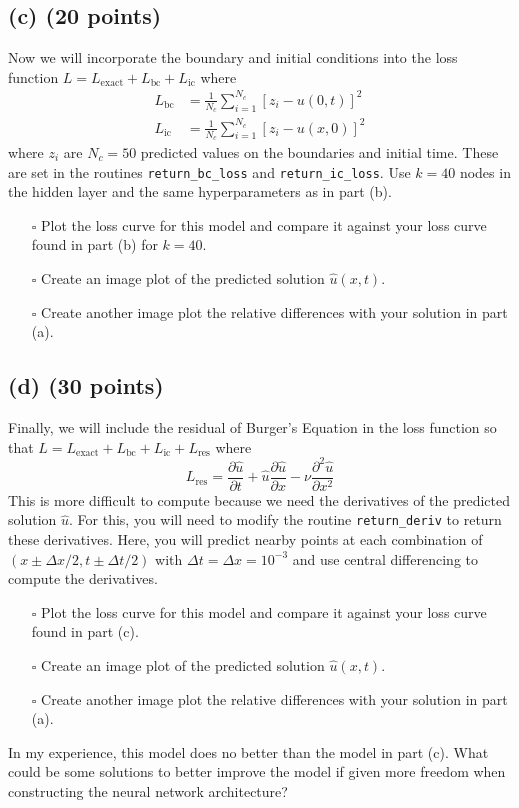 \documentclass{article}
\begin{document}
\subsection*{(c) (20 points)}
Now we will incorporate the boundary and initial conditions into the loss function $L = L_{\text{exact}} + L_{\text{bc}} + L_{\text{ic}}$ where
\begin{align}
    L_{\text{bc}} &= \frac{1}{N_c} \sum_{i=1}^{N_c} \left[z_i - u(0, t)\right]^2 \tag{5}\\
    L_{\text{ic}} &= \frac{1}{N_c} \sum_{i=1}^{N_c} \left[z_i - u(x, 0)\right]^2
\end{align}
where $z_i$ are $N_c = 50$ predicted values on the boundaries and initial time. These are set in the routines \texttt{return\_bc\_loss} and \texttt{return\_ic\_loss}. Use $k = 40$ nodes in the hidden layer and the same hyperparameters as in part (b).
\begin{itemize}
    \item[$\square$] Plot the loss curve for this model and compare it against your loss curve found in part (b) for $k = 40$.
    \item[$\square$] Create an image plot of the predicted solution $\hat{u}(x, t)$.
    \item[$\square$] Create another image plot the relative differences with your solution in part (a).
\end{itemize}

\subsection*{(d) (30 points)}
Finally, we will include the residual of Burger’s Equation in the loss function so that $L = L_{\text{exact}} + L_{\text{bc}} + L_{\text{ic}} + L_{\text{res}}$ where
\begin{equation}
    L_{\text{res}} = \frac{\partial \hat{u}}{\partial t} + \hat{u}\frac{\partial \hat{u}}{\partial x} - \nu \frac{\partial^2 \hat{u}}{\partial x^2} \tag{6}
\end{equation}
This is more difficult to compute because we need the derivatives of the predicted solution $\hat{u}$. For this, you will need to modify the routine \texttt{return\_deriv} to return these derivatives. Here, you will predict nearby points at each combination of $(x \pm \Delta x/2, t \pm \Delta t/2)$ with $\Delta t = \Delta x = 10^{-3}$ and use central differencing to compute the derivatives.
\begin{itemize}
    \item[$\square$] Plot the loss curve for this model and compare it against your loss curve found in part (c).
    \item[$\square$] Create an image plot of the predicted solution $\hat{u}(x, t)$.
    \item[$\square$] Create another image plot the relative differences with your solution in part (a).
\end{itemize}
In my experience, this model does no better than the model in part (c). What could be some solutions to better improve the model if given more freedom when constructing the neural network architecture?
\end{document}
